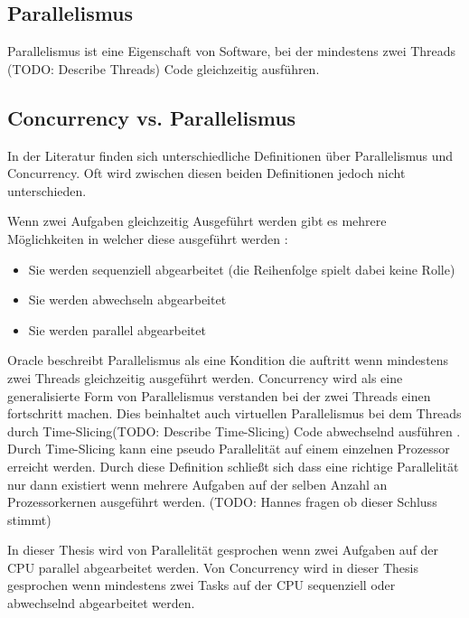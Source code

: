 \subsection{Parallelismus}
\label{section:Parallelismus}

Parallelismus ist eine Eigenschaft von Software, bei der mindestens zwei Threads (TODO: Describe Threads) Code gleichzeitig ausführen. 


\subsection{Concurrency vs. Parallelismus}
\label{section:Parallelismus}

In der Literatur finden sich unterschiedliche Definitionen über Parallelismus und Concurrency. Oft wird zwischen diesen beiden Definitionen jedoch nicht unterschieden.

Wenn zwei Aufgaben gleichzeitig Ausgeführt werden gibt es mehrere Möglichkeiten in welcher diese ausgeführt werden \cite[p. 14]{Erb2012}:

\begin{itemize}
  \item Sie werden sequenziell abgearbeitet (die Reihenfolge spielt dabei keine Rolle)
  \item Sie werden abwechseln abgearbeitet
  \item Sie werden parallel abgearbeitet
\end{itemize}


Oracle beschreibt Parallelismus als eine Kondition die auftritt wenn mindestens zwei Threads gleichzeitig ausgeführt werden. Concurrency wird als eine generalisierte Form von Parallelismus verstanden bei der zwei Threads einen fortschritt machen. Dies beinhaltet auch virtuellen Parallelismus bei dem Threads durch Time-Slicing(TODO: Describe Time-Slicing) Code abwechselnd ausführen \cite[]{oracle:multithreading}. Durch Time-Slicing kann eine pseudo Parallelität auf einem einzelnen Prozessor erreicht werden. Durch diese Definition schließt sich dass eine richtige Parallelität nur dann existiert wenn mehrere Aufgaben auf der selben Anzahl an Prozessorkernen ausgeführt werden. (TODO: Hannes fragen ob dieser Schluss stimmt)

In dieser Thesis wird von Parallelität gesprochen wenn zwei Aufgaben auf der CPU parallel abgearbeitet werden. Von Concurrency wird in dieser Thesis gesprochen wenn mindestens zwei Tasks auf der CPU sequenziell oder abwechselnd abgearbeitet werden.


